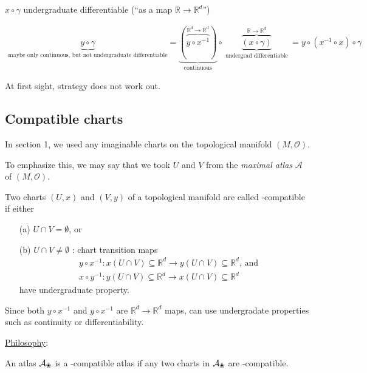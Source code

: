 $x\circ \gamma$ undergraduate differentiable (``as a map $\mathbb{R} \to \mathbb{R}^d$'')

\[
\begin{gathered}
  \underbrace{y \circ \gamma}_{\text{maybe only continuous, but not undergraduate differentiable} } =  \underbrace{ ( \overbrace{ y\circ x^{-1}}^{\mathbb{R}^d \to \mathbb{R}^d }   )}_{\text{continuous}}  \circ \underbrace{ \overbrace{ (x\circ \gamma) }^{\mathbb{R}\to \mathbb{R}^d} }_{ \text{ undergrad differentiable } }  = y \circ (x^{-1} \circ x) \circ \gamma
\end{gathered}
\]

At first sight, strategy does not work out.  

\subsection{Compatible charts}

In section 1, we used any imaginable charts on the topological manifold $(M,\mathcal{O})$.  

To emphasize this, we may say that we took $U$ and $V$ from the \emph{maximal atlas} $\mathcal{A}$ of $(M,\mathcal{O})$.  


\begin{definition}
Two charts $(U,x)$ and $(V,y)$ of a topological manifold are called -compatible if 
either
\begin{enumerate}
  \item[(a)] $U \cap V = \emptyset$, or
  \item[(b)] $U\cap V \neq \emptyset$ : chart transition maps
 \[
\begin{aligned}
  & y \circ x^{-1} : x(U \cap V) \subseteq \mathbb{R}^d  \to y(U\cap V) \subseteq \mathbb{R}^d  \text{, and}\\
  & x\circ y^{-1} : y(U\cap V) \subseteq \mathbb{R}^d   \to x(U\cap V) \subseteq \mathbb{R}^d
\end{aligned}
\]
 have undergraduate  property.
\end{enumerate}
\end{definition}
Since both $y \circ x^{-1}$ and $y \circ x^{-1}$ are $\mathbb{R}^d \to \mathbb{R}^d$ maps, can use undergradate  properties such as continuity or differentiability.


\underline{Philosophy}: 

\begin{definition}
  An atlas $\mathcal{A}_{\text{\ding{96}}}$ is a -compatible atlas if any two charts in $\mathcal{A}_{\text{\ding{96}}}$ are -compatible.

\end{definition}

